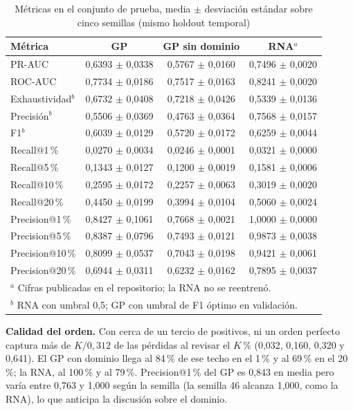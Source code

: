 \documentclass[conference]{IEEEtran}
\begin{document}
\begin{table}[htbp]
\caption{Métricas en el conjunto de prueba, media $\pm$ desviación estándar sobre cinco semillas (mismo holdout temporal)}
\label{tab:comparacion}
\centering
\scriptsize
\setlength{\tabcolsep}{2.5pt}
\begin{tabular}{lccc}
\toprule
\textbf{Métrica} & \textbf{GP} & \textbf{GP sin dominio} & \textbf{RNA}$^{a}$\\
\midrule
PR-AUC & 0,6393 $\pm$ 0,0338 & 0,5767 $\pm$ 0,0160 & 0,7496 $\pm$ 0,0020\\
ROC-AUC & 0,7734 $\pm$ 0,0186 & 0,7517 $\pm$ 0,0163 & 0,8241 $\pm$ 0,0020\\
Exhaustividad$^{b}$ & 0,6732 $\pm$ 0,0408 & 0,7218 $\pm$ 0,0426 & 0,5339 $\pm$ 0,0136\\
Precisión$^{b}$ & 0,5506 $\pm$ 0,0369 & 0,4763 $\pm$ 0,0364 & 0,7568 $\pm$ 0,0157\\
F1$^{b}$ & 0,6039 $\pm$ 0,0129 & 0,5720 $\pm$ 0,0172 & 0,6259 $\pm$ 0,0044\\
\midrule
Recall@1\,\% & 0,0270 $\pm$ 0,0034 & 0,0246 $\pm$ 0,0001 & 0,0321 $\pm$ 0,0000\\
Recall@5\,\% & 0,1343 $\pm$ 0,0127 & 0,1200 $\pm$ 0,0019 & 0,1581 $\pm$ 0,0006\\
Recall@10\,\% & 0,2595 $\pm$ 0,0172 & 0,2257 $\pm$ 0,0063 & 0,3019 $\pm$ 0,0020\\
Recall@20\,\% & 0,4450 $\pm$ 0,0199 & 0,3994 $\pm$ 0,0104 & 0,5060 $\pm$ 0,0024\\
\midrule
Precision@1\,\% & 0,8427 $\pm$ 0,1061 & 0,7668 $\pm$ 0,0021 & 1,0000 $\pm$ 0,0000\\
Precision@5\,\% & 0,8387 $\pm$ 0,0796 & 0,7493 $\pm$ 0,0121 & 0,9873 $\pm$ 0,0038\\
Precision@10\,\% & 0,8099 $\pm$ 0,0537 & 0,7043 $\pm$ 0,0198 & 0,9421 $\pm$ 0,0061\\
Precision@20\,\% & 0,6944 $\pm$ 0,0311 & 0,6232 $\pm$ 0,0162 & 0,7895 $\pm$ 0,0037\\
\bottomrule
\multicolumn{4}{l}{$^{a}$ Cifras publicadas en el repositorio; la RNA no se reentrenó.}\\
\multicolumn{4}{l}{$^{b}$ RNA con umbral 0,5; GP con umbral de F1 óptimo en validación.}\\
\end{tabular}
\end{table}

\textbf{Calidad del orden.} Con cerca de un tercio de positivos, ni un orden
perfecto captura más de $K/0{,}312$ de las pérdidas al revisar el $K$\,\%
(0,032, 0,160, 0,320 y 0,641). El GP con dominio llega al 84\,\% de ese techo
en el 1\,\% y al 69\,\% en el 20\,\%; la RNA, al 100\,\% y al 79\,\%.
Precision@1\,\% del GP es 0,843 en media pero varía entre 0,763 y 1,000 según
la semilla (la semilla 46 alcanza 1,000, como la RNA), lo que anticipa la
discusión sobre el dominio.
\end{document}
